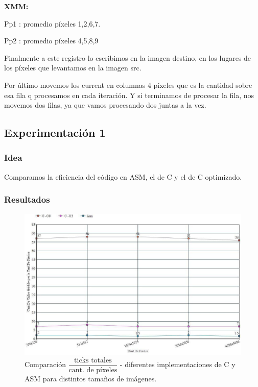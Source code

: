 \par{\textbf{XMM:}}
\par {Pp1 : promedio píxeles {1,2,6,7}.}
\par{Pp2 : promedio píxeles {4,5,8,9}}
	
\par{Finalmente a este registro lo escribimos en la imagen destino, en los lugares de los píxeles que levantamos en la imagen src.}
\par{Por último movemos los current en columnas 4 píxeles que es la cantidad sobre esa fila q procesamos en cada iteración. Y si terminamos de procesar la fila, nos movemos dos filas, ya que vamos procesando dos juntas a la vez.}
	
\subsection{Experimentación 1}

\subsubsection{Idea}	
\par{Comparamos la eficiencia del código en ASM, el de C y el de C optimizado.}
	
\subsubsection{Resultados}
	\begin{figure}[H]
	\centering
	\captionsetup{justification=centering}
	\includegraphics[width = 15 cm, height = 10 cm]{imagenes/pixeAsmC.jpg}
	\caption[center]{Comparación $\dfrac{\text{ticks totales}}{\text{cant. de píxeles}}$ - diferentes implementaciones de C y ASM para distintos tamaños de imágenes.}
\end{figure}

